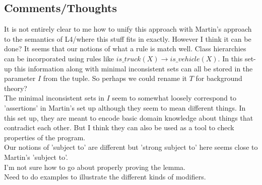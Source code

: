 \subsection{Comments/Thoughts}
It is not entirely clear to me how to unify this approach with Martin's approach to the semantics of L4/where this stuff fits in exactly. However I think it can be done? It seems that our notions of what a rule is match well. Class hierarchies can be incorporated using rules like $is\_truck(X)\rightarrow is\_vehicle(X)$. In this set-up this information along with minimal inconsistent sets can all be stored in the parameter $I$ from the tuple. So perhaps we could rename it $T$ for background theory?\\
\newline
The minimal inconsistent sets in $I$ seem to somewhat loosely correspond to 'assertions' in Martin's set up although they seem to mean different things. In this set up, they are meant to encode basic domain knowledge about things that contradict each other. But I think they can also be used as a tool to check properties of the program.\\
\newline
Our notions of 'subject to' are different but 'strong subject to' here seems close to Martin's 'subject to'.\\
\newline
I'm not sure how to go about properly proving the lemma.\\
\newline
Need to do examples to illustrate the different kinds of modifiers.
